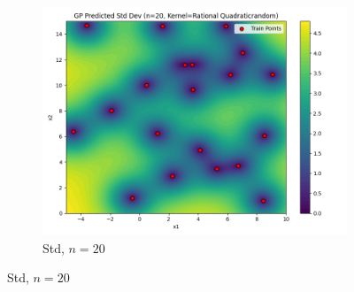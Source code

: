 \documentclass[a4paper,12pt]{article}
\begin{document}
\begin{figure}[H]
\begin{subfigure}{0.3\textwidth}
    \includegraphics[width=\linewidth]{Task-02/images/gp_std_rational_quadratic_n20_random.png}
    \caption{Std, $n=20$}
\end{subfigure}


\end{figure}
\end{document}
